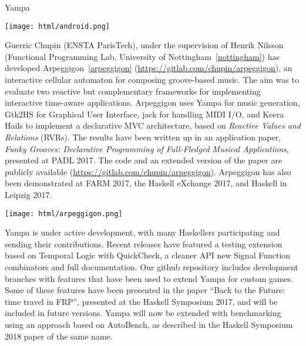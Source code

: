 \begin{hcarentry}[updated]{Yampa}
\begin{center}
\texttt{[image: html/android.png]}
\end{center}

Guerric Chupin (ENSTA ParisTech), under the supervision of Henrik Nilsson
(Functional Programming Lab, University of Nottingham~\cref{nottingham}) has
developed Arpeggigon~\cref{arpeggigon}
(\href{https://gitlab.com/chupin/arpeggigon}{https://gitlab.com/chupin/arpeggigon}),
an interactive cellular automaton for composing groove-based music. The aim
was to evaluate two reactive but complementary frameworks for implementing
interactive time-aware applications. Arpeggigon uses Yampa for music
generation, Gtk2HS for Graphical User Interface, jack for handling MIDI I/O,
and Keera Hails to implement a declarative MVC architecture, based on
\emph{Reactive Values and Relations} (RVRs). The results have been written up
in an application paper, \emph{Funky Grooves: Declarative Programming of
Full-Fledged Musical Applications}, presented at PADL 2017. The code and an
extended version of the paper are publicly available
(\href{https://gitlab.com/chupin/arpeggigon}{https://gitlab.com/chupin/arpeggigon}).
Arpeggigon has also been demonstrated at FARM 2017, the Haskell eXchange 2017,
and Haskell in Leipzig 2017. 

\begin{center}
  \texttt{[image: html/arpeggigon.png]}
\end{center}

Yampa is under active development, with many Haskellers participating and
sending their contributions. Recent releases have featured a testing extension
based on Temporal Logic with QuickCheck, a cleaner API
new Signal Function combinators and
full documentation. Our github repository includes development
branches with features that have been used to extend Yampa for custom games.
Some of these features have been presented in the paper ``Back to the Future:
time travel in FRP'', presented at the Haskell Symposium 2017, and will be
included in future versions. Yampa will now be extended with benchmarking
using an approach based on AutoBench, as described in the Haskell
Symposium 2018 paper of the same name.


\end{hcarentry}
